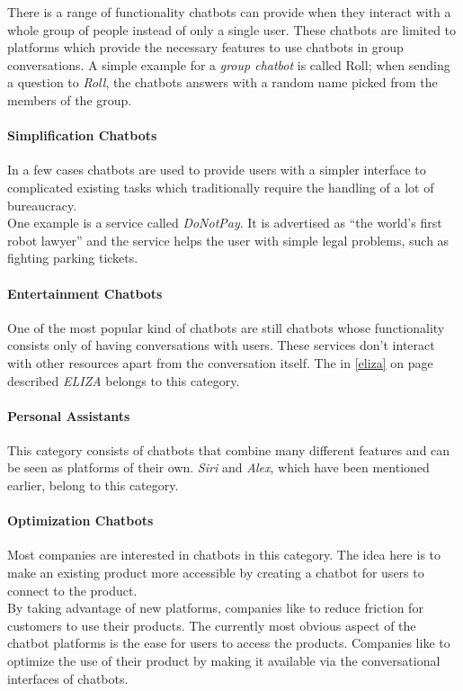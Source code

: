 There is a range of functionality chatbots can provide when they interact with a whole group of people instead of only a single user.
These chatbots are limited to platforms which provide the necessary features to use chatbots in group conversations.
A simple example for a \emph{group chatbot} is called Roll\cite{venturebeat};
when sending a question to \emph{Roll}, the chatbots answers with a random name picked from the members of the group.


\paragraph{Simplification Chatbots}

In a few cases chatbots are used to provide users with a simpler interface to complicated existing tasks which traditionally require the handling of a lot of bureaucracy.
\\
One example is a service called \emph{DoNotPay}.
It is advertised as ``the world's first robot lawyer''\cite{oreilly} and the service helps the user with simple legal problems,
such as fighting parking tickets.


\paragraph{Entertainment Chatbots}

One of the most popular kind of chatbots are still chatbots whose functionality consists only of having conversations with users.
These services don't interact with other resources apart from the conversation itself.
The in \ref{eliza} on page \pageref{eliza} described \emph{ELIZA} belongs to this category.


\paragraph{Personal Assistants}
\label{assistants}

This category consists of chatbots that combine many different features and can be seen as platforms of their own.
\emph{Siri} and \emph{Alex}, which have been mentioned earlier, belong to this category.


\paragraph{Optimization Chatbots}

Most companies are interested in chatbots in this category.
The idea here is to make an existing product more accessible by creating a chatbot for users to connect to the product.
\\
By taking advantage of new platforms, companies like to reduce friction for customers to use their products.
The currently most obvious aspect of the chatbot platforms is the ease for users to access the products.
Companies like to optimize the use of their product by making it available via the conversational interfaces of chatbots.
\\

